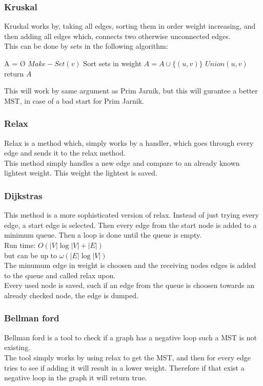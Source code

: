 \documentclass[12pt, a4paper]{article}
\begin{document}
			\subsubsection{Kruskal}
				Kruskal works by, taking all edges, sorting them in order weight increasing, and then adding all edges which, connects two otherwise unconnected edges.\\
				This can be done by sets in the following algorithm:
				\begin{algorithmic}[1]
					\State A = Ø
						\State $Make-Set(v)$
					\EndFor
					\State Sort sets in weight 
							\State $A=A\cup \{(u,v)\}$
							\State $Union(u,v)$
						\EndIf
					\EndFor
					\State return $A$
				\end{algorithmic}
				This will work by same argument as Prim Jarnik, but this will gurantee a better MST, in case of a bad start for Prim Jarnik.
			\subsubsection{Relax}
				Relax is a method which, simply works by a handler, which goes through every edge and sends it to the relax method.\\
				This method simply handles a new edge and compare to an already known lightest weight. This weight the lightest is saved.
			\subsubsection{Dijkstras}
				This method is a more sophisticated version of relax. Instead of just trying every edge, a start edge is selected. Then every edge from the start node is added to a minimum queue. Then a loop is done until the queue is empty.\\
				Run time: $O(|V|\log |V| + |E|)$\\ but can be up to $\omega(|E|\log |V|)$\\
				The minumum edge in weight is choosen and the receiving nodes edges is added to the queue and called relax upon.\\
				Every used node is saved, such if an edge from the queue is choosen towards an already checked node, the edge is dumped.\\
			\subsubsection{Bellman ford}
				Bellman ford is a tool to check if a graph has a negative loop such a MST is not existing.\\
				The tool simply works by using relax to get the MST, and then for every edge tries to see if adding it will result in a lower weight. Therefore if that exist a negative loop in the graph it will return true.
						
				
			
				
	
				
\end{document}
